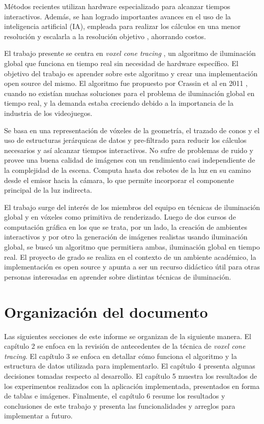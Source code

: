 Métodos recientes utilizan hardware especializado para alcanzar tiempos interactivos.
Además, se han logrado importantes avances en el uso de la inteligencia artificial (IA), empleada para realizar los cálculos en una menor resolución y escalarla a la resolución objetivo \cite{image-super-resolution-survey}, ahorrando costos.

El trabajo presente se centra en \textit{voxel cone tracing} \cite{voxel-cone-tracing}, un algoritmo de iluminación global que funciona en tiempo real sin necesidad de hardware específico.
El objetivo del trabajo es aprender sobre este algoritmo y crear una implementación open source del mismo.
El algoritmo fue propuesto por Crassin et al en 2011 \cite{voxel-cone-tracing}, cuando no existían muchas soluciones para el problema de iluminación global en tiempo real, y la demanda estaba creciendo debido a la importancia de la industria de los videojuegos.

Se basa en una representación de vóxeles \cite[p.~578]{rtr} de la geometría, el trazado de conos \cite{ray-tracing-with-cones} y el uso de estructuras jerárquicas de datos y pre-filtrado para reducir los cálculos necesarios y así alcanzar tiempos interactivos.
No sufre de problemas de ruido y provee una buena calidad de imágenes con un rendimiento casi independiente de la complejidad de la escena.
Computa hasta dos rebotes de la luz en su camino desde el emisor hacia la cámara, lo que permite incorporar el componente principal de la luz indirecta.

El trabajo surge del interés de los miembros del equipo en técnicas de iluminación global y en vóxeles como primitiva de renderizado.
Luego de dos cursos de computación gráfica en los que se trata, por un lado, la creación de ambientes interactivos y por otro la generación de imágenes realistas usando iluminación global, se buscó un algoritmo que permitiera ambas, iluminación global en tiempo real.
El proyecto de grado se realiza en el contexto de un ambiente académico, la implementación es open source y apunta a ser un recurso didáctico útil para otras personas interesadas en aprender sobre distintas técnicas de iluminación.

\section{Organización del documento}

Las siguientes secciones de este informe se organizan de la siguiente manera.
El capítulo 2 se enfoca en la revisión de antecedentes de la técnica de \textit{voxel cone tracing}.
El capítulo 3 se enfoca en detallar cómo funciona el algoritmo y la estructura de datos utilizada para implementarlo.
El capítulo 4 presenta algunas decisiones tomadas respecto al desarrollo.
El capítulo 5 muestra los resultados de los experimentos realizados con la aplicación implementada, presentados en forma de tablas e imágenes.
Finalmente, el capítulo 6 resume los resultados y conclusiones de este trabajo y presenta las funcionalidades y arreglos para implementar a futuro.
